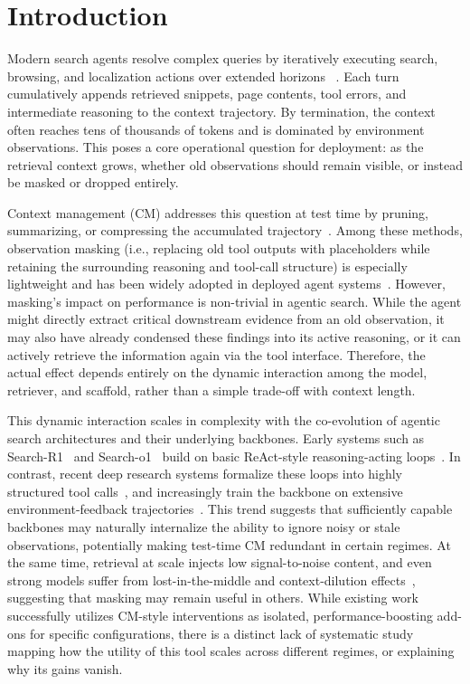 \section{Introduction}

Modern search agents resolve complex queries by iteratively executing search, browsing, and localization actions over extended horizons
~\citep{openai_dr,gemini_dr,anthropic2025claude_research,moonshot2025kimi_researcher,grok_ds,perplexity_dr}. Each turn cumulatively appends retrieved snippets, page contents, tool errors, and intermediate reasoning to the context trajectory.
By termination, the context often reaches tens of thousands of tokens and is dominated by environment observations. This poses a core operational question for deployment: as the retrieval context grows, whether old observations should remain visible, or instead be masked or dropped entirely.


Context management (CM) addresses this question at test time by pruning, summarizing, or compressing the accumulated trajectory~\citep{wu2025resum,ye2025agentfold}.
Among these methods, observation masking (i.e., replacing old tool outputs with placeholders while retaining the surrounding reasoning and tool-call structure) is especially lightweight and has been widely adopted in deployed agent systems~\citep{anthropic2024claudecode,jetbrain_code_cm,langchain_cm,li2026dci}.
However, masking's impact on performance is non-trivial in agentic search. While the agent might directly extract critical downstream evidence from an old observation, it may also have already condensed these findings into its active reasoning, or it can actively retrieve the information again via the tool interface. Therefore, the actual effect depends entirely on the dynamic interaction among the model, retriever, and scaffold, rather than a simple trade-off with context length.


This dynamic interaction scales in complexity with the co-evolution of agentic search architectures and their underlying backbones. 
Early systems such as Search-R1~\citep{jin2025searchr1} and Search-o1~\citep{li2025searcho1} build on basic ReAct-style reasoning-acting loops~\citep{yao2022react}. 
In contrast, recent deep research systems formalize these loops into highly structured tool calls~\citep{zheng2025deepresearcher,miromind2025mirothinker}, and increasingly train the backbone on extensive environment-feedback trajectories~\citep{cao2026qwen3nextcoder,zhang2025rlm}. 
This trend suggests that sufficiently capable backbones may naturally internalize the ability to ignore noisy or stale observations, potentially making test-time CM redundant in certain regimes.
At the same time, retrieval at scale injects low signal-to-noise content, and even strong models suffer from lost-in-the-middle and context-dilution effects~\citep{liu2024lost}, suggesting that masking may remain useful in others. 
While existing work successfully utilizes CM-style interventions as isolated, performance-boosting add-ons for specific configurations, there is a distinct lack of systematic study mapping how the utility of this tool scales across different regimes, or explaining why its gains vanish.

